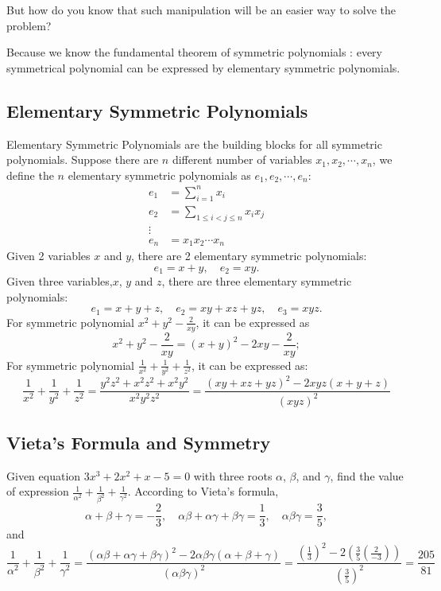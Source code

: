\documentclass[11pt, oneside]{article}   	%
\begin{document}
But how do you know that such manipulation will be an easier way to solve the problem?

Because we know the fundamental theorem of symmetric polynomials : every symmetrical polynomial can be expressed by elementary symmetric polynomials. 
 
 \subsection{Elementary Symmetric Polynomials}
 Elementary Symmetric Polynomials are the building blocks for all symmetric polynomials. Suppose there are $n$ different number of variables $x_1, x_2, \cdots, x_n$, we define the $n$ elementary symmetric polynomials as $e_1, e_2, \cdots, e_n$:
 \begin{align*}
 e_1&= \sum_{i=1}^{n} x_i \\
 e_2&=\sum_{1\le i<j\le n}x_i x_j\\
 \vdots\\
 e_n&=x_1 x_2  \cdots x_n
 \end{align*}
 Given 2 variables $x$ and $y$, there are 2 elementary symmetric polynomials: 
 \[e_1=x+y, \quad e_2=xy.\]
 Given three variables,$x$, $y$ and $z$, there are three elementary symmetric polynomials:
  \[e_1=x+y+z, \quad e_2=xy+xz+yz, \quad e_3=xyz.\]
  For symmetric polynomial $x^2+y^2-\frac{2}{xy}$, it can be expressed as 
  \[x^2+y^2-\frac{2}{xy} = (x+y)^2-2xy-\frac{2}{xy} ; \]
  For symmetric polynomial $\frac{1}{x^2} + \frac{1}{y^2} + \frac{1}{z^2}$, it can be expressed as:
  \[\frac{1}{x^2} + \frac{1}{y^2} + \frac{1}{z^2}=\frac{y^2 z^2+x^2 z^2+x^2 y^2}{x^2 y^2 z^2}=\frac{(xy+xz+yz)^2-2xyz(x+y+z)}{(xyz)^2}\]
  
  \subsection{Vieta's Formula and Symmetry}
  Given equation $3x^3+2x^2+x-5=0$ with three roots $\alpha$, $\beta$, and $\gamma$, find the value of expression $\frac{1}{\alpha^2}+\frac{1}{\beta^2}+\frac{1}{\gamma^2}$. According to Vieta's formula, 
  \[\alpha+\beta+\gamma= - \frac{2}{3}, \quad \alpha\beta + \alpha\gamma +\beta\gamma= \frac{1}{3}, \quad \alpha\beta\gamma = \frac{3}{5},\] and
  \[\frac{1}{\alpha^2}+\frac{1}{\beta^2}+\frac{1}{\gamma^2}=\frac{(\alpha\beta+\alpha\gamma+\beta\gamma)^2-2\alpha\beta\gamma(\alpha+\beta+\gamma)}{(\alpha\beta\gamma)^2}=\frac{(\frac{1}{3})^2-2(\frac{3}{5}(\frac{2}{-3}))}{(\frac{3}{5})^2}=\frac{205}{81}\]
  
\end{document}
